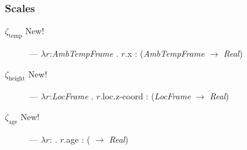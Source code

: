 \subsubsection{Scales}

\begin{description}
  
\item[\textnormal{$\zeta_{\text{temp}}$} New!] ---
  $\lambda r$:\textit{AmbTempFrame} . $r$.x : (\textit{AmbTempFrame}
  $\rightarrow$ \textit{Real})

  
\item[\textnormal{$\zeta_{\mathrm{height}}$} New!] ---
  $\lambda r$:\textit{LocFrame} . $r$.loc.z-coord : (\textit{LocFrame}
  $\rightarrow$ \textit{Real})

  
\item[\textnormal{$\zeta_{\text{age}}$} New!] ---  
$\lambda r$:
                       . $r$.age : (
                       $\rightarrow$ \textit{Real})

\end{description}



